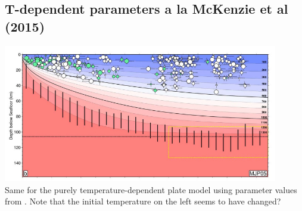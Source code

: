 \subsection*{T-dependent parameters a la McKenzie et al (2015)}

\begin{center}
\includegraphics[width=12cm]{python_codes/fieldstone_83/images/rihc18b}\\
{\captionfont Same for the purely temperature-dependent plate model using parameter values from
\textcite{mcjp05}. Note that the initial temperature on the left seems to have changed?}
\end{center}


